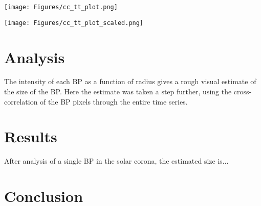 \documentclass[preprint2]{aastex}
\begin{document}
\begin{figure*}[htb!]
    \texttt{[image: Figures/cc\_tt\_plot.png]}
    \caption{The highest cross-correlation value of each pixel is plotted as a function
        of its distance from the center pixel. The color indicates the timelag
        corresponding to the maximum cross-correlation for that pixel.}
    \label{tau_all}
\end{figure*}

\begin{figure*}[htb!]
    \texttt{[image: Figures/cc\_tt\_plot\_scaled.png]}
    \caption{Same as figure \ref{tau_all}, but with two thirds of the timelag cut out
        at both ends.}
\end{figure*}

\section{Analysis}\label{analysis}
The intensity of each BP as a function of radius gives a rough visual estimate
of the size of the BP. Here the estimate was taken a step further, using the
cross-correlation of the BP pixels through the entire time series.

\section{Results}\label{results}
After analysis of a single BP in the solar corona, the estimated size is...


\section{Conclusion}\label{conclusion}


\end{document}
